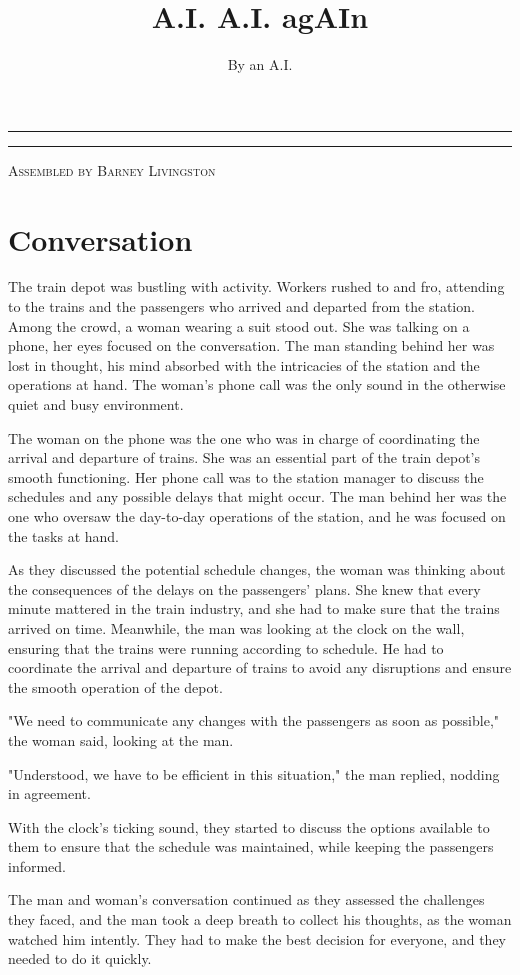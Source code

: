 \documentclass[smalldemyvopaper,11pt,twoside,onecolumn,openright,extrafontsizes]{memoir}
\title{A.I. A.I. agAIn}
\author{By an A.I.}
\newcommand{\press}{Assembled by Barney Livingston}
\newlength\drop
\newcommand*\titleM{\begingroup %
  \setlength\drop{0.15\textheight}
  \begin{center}
  \vspace*{\drop}
  \rule{\textwidth}{0in}\par
  {\HUGE\textsc\thetitle\par}
  \rule{\textwidth}{0in}\par
  {\Large\textit\theauthor\par}
  \vfill
  {\Large\scshape\press}
  \end{center}
\endgroup}
\begin{document}
\pagestyle{empty}
\titleM
\clearpage

\frontmatter
\pagestyle{mystyle}
\clearpage
\tableofcontents*

\mainmatter
\chapter{Conversation}
The train depot was bustling with activity. Workers rushed to and fro, attending to the trains and the passengers who arrived and departed from the station. Among the crowd, a woman wearing a suit stood out. She was talking on a phone, her eyes focused on the conversation. The man standing behind her was lost in thought, his mind absorbed with the intricacies of the station and the operations at hand. The woman's phone call was the only sound in the otherwise quiet and busy environment.\par
The woman on the phone was the one who was in charge of coordinating the arrival and departure of trains. She was an essential part of the train depot's smooth functioning. Her phone call was to the station manager to discuss the schedules and any possible delays that might occur. The man behind her was the one who oversaw the day-to-day operations of the station, and he was focused on the tasks at hand.\par
As they discussed the potential schedule changes, the woman was thinking about the consequences of the delays on the passengers' plans. She knew that every minute mattered in the train industry, and she had to make sure that the trains arrived on time. Meanwhile, the man was looking at the clock on the wall, ensuring that the trains were running according to schedule. He had to coordinate the arrival and departure of trains to avoid any disruptions and ensure the smooth operation of the depot.\par
"We need to communicate any changes with the passengers as soon as possible," the woman said, looking at the man.\par
"Understood, we have to be efficient in this situation," the man replied, nodding in agreement.\par
With the clock's ticking sound, they started to discuss the options available to them to ensure that the schedule was maintained, while keeping the passengers informed.\par
The man and woman's conversation continued as they assessed the challenges they faced, and the man took a deep breath to collect his thoughts, as the woman watched him intently. They had to make the best decision for everyone, and they needed to do it quickly.\par
\end{document}
